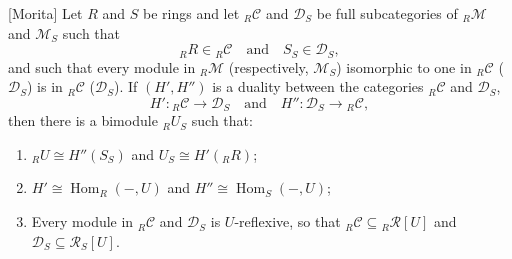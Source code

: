 [Morita] Let $R$ and $S$ be rings and let ${}_R \mathcal{C}$ and $\mathcal{D}_S$ be full subcategories of ${}_R \mathcal{M}$ and $\mathcal{M}_S$ such that
$${}_R R \in {}_R \mathcal{C} \quad \text{and} \quad S_S \in \mathcal{D}_S,$$
and such that every module in ${}_R \mathcal{M}$ (respectively, $\mathcal{M}_S$) isomorphic to one in ${}_R \mathcal{C}$ ($\mathcal{D}_S$) is in ${}_R \mathcal{C}$ ($\mathcal{D}_S$). If $(H', H'')$ is a duality between the categories ${}_R \mathcal{C}$ and $\mathcal{D}_S$,
$$H': {}_R \mathcal{C} \to \mathcal{D}_S \quad \text{and} \quad H'': \mathcal{D}_S \to {}_R \mathcal{C},$$
then there is a bimodule ${}_R U_S$ such that:
\begin{enumerate}
    \item[(1)] ${}_R U \cong H''(S_S)$ and $U_S \cong H'({}_R R)$;
    \item[(2)] $H' \cong \operatorname{Hom}_R(-, U)$ and $H'' \cong \operatorname{Hom}_S(-, U)$;
    \item[(3)] Every module in ${}_R \mathcal{C}$ and $\mathcal{D}_S$ is $U$-reflexive, so that ${}_R \mathcal{C} \subseteq {}_R \mathcal{R}[U]$ and $\mathcal{D}_S \subseteq \mathcal{R}_S[U]$.
\end{enumerate}
